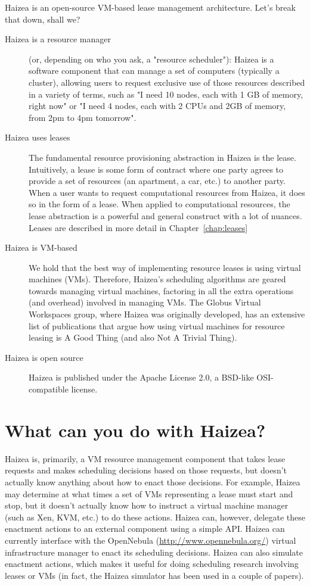 Haizea is an open-source VM-based lease management architecture. Let's break that down, shall we?

\begin{description}
\item[Haizea is a resource manager] (or, depending on who you ask, a "resource scheduler"): Haizea is a software component that can manage a set of computers (typically a cluster), allowing users to request exclusive use of those resources described in a variety of terms, such as "I need 10 nodes, each with 1 GB of memory, right now" or "I need 4 nodes, each with 2 CPUs and 2GB of memory, from 2pm to 4pm tomorrow".
\item[Haizea uses leases] The fundamental resource provisioning abstraction in Haizea is the lease. Intuitively, a lease is some form of contract where one party agrees to provide a set of resources (an apartment, a car, etc.) to another party. When a user wants to request computational resources from Haizea, it does so in the form of a lease. When applied to computational resources, the lease abstraction is a powerful and general construct with a lot of nuances. Leases are described in more detail in Chapter~\ref{chap:leases}
\item[Haizea is VM-based] We hold that the best way of implementing resource leases is using virtual machines (VMs). Therefore, Haizea's scheduling algorithms are geared towards managing virtual machines, factoring in all the extra operations (and overhead) involved in managing VMs. The Globus Virtual Workspaces group, where Haizea was originally developed, has an extensive list of publications that argue how using virtual machines for resource leasing is \textsf{A Good Thing} (and also \textsf{Not A Trivial Thing}).
\item[Haizea is open source] Haizea is published under the Apache License 2.0, a BSD-like OSI-compatible license.
\end{description}

\section{What can you do with Haizea?}

Haizea is, primarily, a VM resource management component that takes lease requests and makes scheduling decisions based on those requests, but doesn't actually know anything about how to enact those decisions. For example, Haizea may determine at what times a set of VMs representing a lease must start and stop, but it doesn't actually know how to instruct a virtual machine manager (such as Xen, KVM, etc.) to do these actions. Haizea can, however, delegate these enactment actions to an external component using a simple API. Haizea can currently interface with the OpenNebula (\url{http://www.opennebula.org/}) virtual infrastructure manager to enact its scheduling decisions. Haizea can also simulate enactment actions, which makes it useful for doing scheduling research involving leases or VMs (in fact, the Haizea simulator has been used in a couple of papers).


